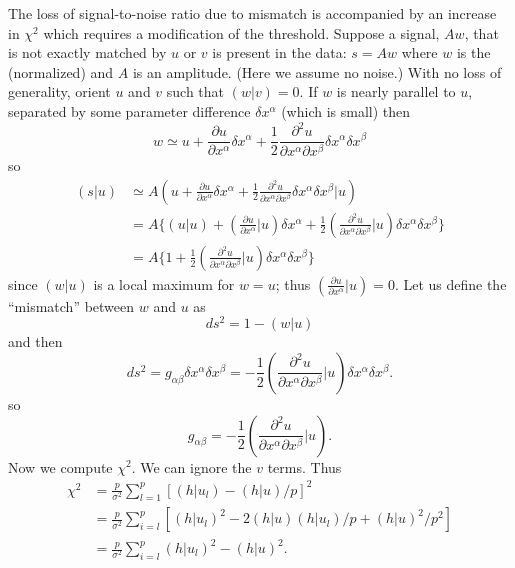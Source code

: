 The loss of signal-to-noise ratio due to mismatch is accompanied by an
increase in $\chi^2$ which requires a modification of the threshold.
Suppose a signal, $Aw$, that is not exactly matched by $u$ or $v$
is present in the data: $s=Aw$ where $w$ is the (normalized) and $A$ is an
amplitude.  (Here we assume no noise.)  With no loss of generality, orient $u$
and $v$ such that $(w|v)=0$.  If $w$ is nearly parallel to $u$, separated by
some parameter difference $\delta x^\alpha$ (which is small) then
\begin{equation}
  w \simeq u + \frac{\partial u}{\partial x^\alpha}\delta x^\alpha 
  + \frac{1}{2}\frac{\partial^2 u}{\partial x^\alpha \partial x^\beta}\delta x^\alpha\delta x^\beta
\end{equation}
so
\begin{equation}
\begin{split}
  (s|u) &\simeq A\left(u + \frac{\partial u}{\partial x^\alpha}\delta x^\alpha 
  + \frac{1}{2} \frac{\partial^2u}{\partial x^\alpha\partial x^\beta}\delta x^\alpha\delta x^\beta\bigl|u\right)
  \\
  &= A\bigl\{ (u|u) + \left(\frac{\partial u}{\partial x^\alpha}\big|u\right)\delta x^\alpha
  + \frac{1}{2} \left(\frac{\partial^2 u}{\partial x^\alpha \partial x^\beta}\bigl|u\right)\delta x^\alpha\delta x^\beta
  \bigr\}\\
  &= A\bigl\{ 1 +
  \frac{1}{2} \left(\frac{\partial^2 u}{\partial x^\alpha \partial x^\beta}\bigl|u\right)\delta x^\alpha\delta x^\beta
  \bigr\}
\end{split}
\end{equation}
since $(w|u)$ is a local maximum for $w=u$; thus $(\frac{\partial u}{\partial x^\alpha}|u)=0$.
Let us define the ``mismatch'' between $w$ and $u$ as
\begin{equation}
ds^2 = 1 - (w|u)
\end{equation}
and then
\begin{equation}
  ds^2 = g_{\alpha\beta}\delta x^\alpha\delta x^\beta =
  - \frac{1}{2} \left(\frac{\partial^ 2u}{\partial x^\alpha \partial x^\beta}\bigl|u\right)\delta x^\alpha\delta x^\beta.
\end{equation}
so
\begin{equation}
g_{\alpha\beta}=-{\frac{1}{2}}\left(\frac{\partial^2 u}{\partial x^\alpha\partial x^\beta}\bigl|u\right).
\end{equation}
Now we compute $\chi^2$.  We can ignore the $v$ terms.  Thus
\begin{equation}
\begin{split}
\chi^2 &= \frac{p}{\sigma^2} \sum_{l=1}^p \left[ (h|u_l) - (h|u)/p \right]^2  \\
&= \frac{p}{\sigma^2} \sum_{i=l}^p \left[ (h|u_l)^2 - 2(h|u)(h|u_l)/p + (h|u)^2/p^2 \right] \\
&= \frac{p}{\sigma^2}\sum_{i=l}^p (h|u_l)^2 - (h|u)^2.
\end{split}
\end{equation}
